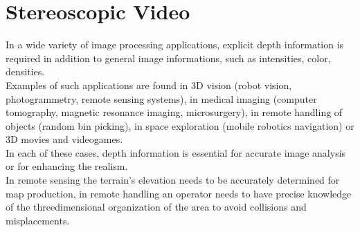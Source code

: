\chapter{Stereoscopic Video}
\label{stereo_video}

In a wide variety of image processing applications, explicit depth information is required in
addition to general image informations, such as intensities, color, densities.\\
Examples of such applications are found in 3D vision (robot vision, photogrammetry, remote sensing systems), in medical imaging (computer tomography,
magnetic resonance imaging, microsurgery), in remote handling of objects (random bin picking), in space exploration (mobile robotics navigation) or 3D movies and videogames.\\
In each of these cases, depth information is essential for accurate image analysis or for enhancing the
realism.\\
In remote sensing the terrain's elevation needs to be accurately determined for map production, in remote handling an operator needs to have precise knowledge of the threedimensional organization of the area to avoid collisions and misplacements.\\
